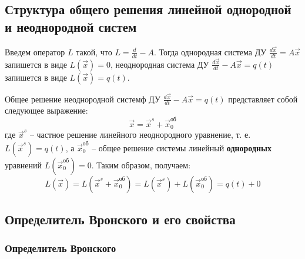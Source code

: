 \subsection{Структура общего решения линейной однородной и неоднородной систем}
Введем оператор $L$ такой, что $L = \frac{d}{dt} - A$. Тогда однородная система ДУ $\frac{d \vec x}{dt} = A \vec x$ запишется в виде
$L(\vec x) = 0$, неоднородная система ДУ $\frac{d \vec x}{dt} - A \vec x = q(t)$ запишется в виде $L(\vec x) = q(t)$.

\begin{proposition}
    Общее решение неоднородной системф ДУ $\frac{d \vec x}{dt} - A \vec x = q(t)$ представляет собой следующее выражение:
    \begin{equation}
        \vec x = \vec x^s + \vec x^{\text{об}}_0
    \end{equation}
    где $\vec x^s$ -- частное решение линейного неоднородного уравнение, т. е. $L(\vec x^s) = q(t)$, а
    $\vec x^{\text{об}}_0$ -- общее решение системы линейный \textbf{однородных} уравнений $L(\vec x^{\text{об}}_0) = 0$.
    Таким образом, получаем:
    \[L(\vec x) = L(\vec x^s + \vec x^{\text{об}}_0) = L(\vec x^s) + L(\vec x^{\text{об}}_0) = q(t) + 0\]
\end{proposition}

\subsection{Определитель Вронского и его свойства}

\subsubsection{Определитель Вронского}

